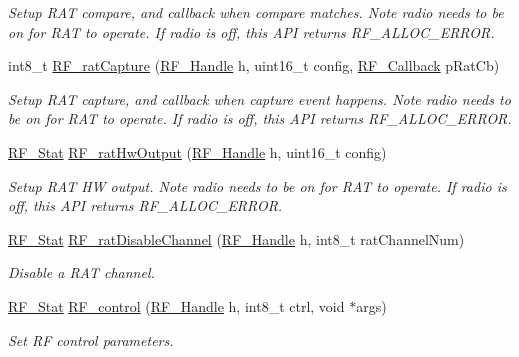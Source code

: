 \begin{DoxyCompactItemize}
\begin{DoxyCompactList}\small\item\em Setup R\+A\+T compare, and callback when compare matches. Note radio needs to be on for R\+A\+T to operate. If radio is off, this A\+P\+I returns R\+F\+\_\+\+A\+L\+L\+O\+C\+\_\+\+E\+R\+R\+O\+R. \end{DoxyCompactList}\item 
int8\+\_\+t \hyperlink{_r_f_8h_a68013d7c8a5a0eed8add518b30679abe}{R\+F\+\_\+rat\+Capture} (\hyperlink{_r_f_8h_a5e8ab7fc87fb818f435d9b6226ee573f}{R\+F\+\_\+\+Handle} h, uint16\+\_\+t config, \hyperlink{_r_f_8h_a4d2ce6dc70b0f329dc5e249ec10c574a}{R\+F\+\_\+\+Callback} p\+Rat\+Cb)
\begin{DoxyCompactList}\small\item\em Setup R\+A\+T capture, and callback when capture event happens. Note radio needs to be on for R\+A\+T to operate. If radio is off, this A\+P\+I returns R\+F\+\_\+\+A\+L\+L\+O\+C\+\_\+\+E\+R\+R\+O\+R. \end{DoxyCompactList}\item 
\hyperlink{_r_f_8h_afdc219ddabc8427ecd552a6c78d9988f}{R\+F\+\_\+\+Stat} \hyperlink{_r_f_8h_ad55cb257d42afee6a93016a37e7f9027}{R\+F\+\_\+rat\+Hw\+Output} (\hyperlink{_r_f_8h_a5e8ab7fc87fb818f435d9b6226ee573f}{R\+F\+\_\+\+Handle} h, uint16\+\_\+t config)
\begin{DoxyCompactList}\small\item\em Setup R\+A\+T H\+W output. Note radio needs to be on for R\+A\+T to operate. If radio is off, this A\+P\+I returns R\+F\+\_\+\+A\+L\+L\+O\+C\+\_\+\+E\+R\+R\+O\+R. \end{DoxyCompactList}\item 
\hyperlink{_r_f_8h_afdc219ddabc8427ecd552a6c78d9988f}{R\+F\+\_\+\+Stat} \hyperlink{_r_f_8h_a46e80aefad925b12066a7a94d532dc25}{R\+F\+\_\+rat\+Disable\+Channel} (\hyperlink{_r_f_8h_a5e8ab7fc87fb818f435d9b6226ee573f}{R\+F\+\_\+\+Handle} h, int8\+\_\+t rat\+Channel\+Num)
\begin{DoxyCompactList}\small\item\em Disable a R\+A\+T channel. \end{DoxyCompactList}\item 
\hyperlink{_r_f_8h_afdc219ddabc8427ecd552a6c78d9988f}{R\+F\+\_\+\+Stat} \hyperlink{_r_f_8h_aa31772d56afb197fd812d24aa6f07f1b}{R\+F\+\_\+control} (\hyperlink{_r_f_8h_a5e8ab7fc87fb818f435d9b6226ee573f}{R\+F\+\_\+\+Handle} h, int8\+\_\+t ctrl, void $\ast$args)
\begin{DoxyCompactList}\small\item\em Set R\+F control parameters. \end{DoxyCompactList}\item 

\end{DoxyCompactItemize}
